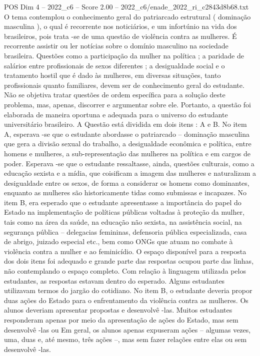 \begin{textsample}{POS Dim 4 – 2022\_c6 – Score 2.00 – 2022\_c6/enade\_2022\_ri\_c2843d8b68.txt}
O tema contemplou o conhecimento geral do patriarcado estrutural ( dominação masculina ), o qual é recorrente nos noticiários, e um infortúnio na vida dos brasileiros, pois trata -se de uma questão de violência contra as mulheres.
É recorrente assistir ou ler notícias sobre o domínio masculino na sociedade brasileira.
Questões como a participação da mulher na política ; a paridade de salários entre profissionais de sexos diferentes ; a desigualdade social e o tratamento hostil que é dado às mulheres, em diversas situações, tanto profissionais quanto familiares, devem ser de conhecimento geral do estudante.
Não se objetiva tratar questões de ordem específica para a solução deste problema, mas, apenas, discorrer e argumentar sobre ele.
Portanto, a questão foi elaborada de maneira oportuna e adequada para o universo do estudante universitário brasileiro.
A Questão está dividida em dois itens : A e B.
No item A, esperava -se que o estudante abordasse o patriarcado – dominação masculina que gera a divisão sexual do trabalho, a desigualdade econômica e política, entre homens e mulheres, a sub-representação das mulheres na política e em cargos de poder.
Esperava -se que o estudante ressaltasse, ainda, questões culturais, como a educação sexista e a mídia, que coisificam a imagem das mulheres e naturalizam a desigualdade entre os sexos, de forma a considerar os homens como dominantes, enquanto as mulheres são historicamente tidas como submissas e incapazes.
No item B, era esperado que o estudante apresentasse a importância do papel do Estado na implementação de políticas públicas voltadas à proteção da mulher, tais como na área da saúde, na educação não sexista, na assistência social, na segurança pública – delegacias femininas, defensoria pública especializada, casa de abrigo, juizado especial etc., bem como ONGs que atuam no combate à violência contra a mulher e ao feminicídio.
O espaço disponível para a resposta dos dois itens foi adequado e grande parte das respostas ocupou parte das linhas, não contemplando o espaço completo.
Com relação à linguagem utilizada pelos estudantes, as respostas estavam dentro do esperado.
Alguns estudantes utilizavam termos do jargão do cotidiano.
No item B, o estudante deveria propor duas ações do Estado para o enfrentamento da violência contra as mulheres.
Os alunos deveriam apresentar propostas e desenvolvê -las.
Muitos estudantes responderam apenas por meio da apresentação de ações do Estado, mas sem desenvolvê -las ou Em geral, os alunos apenas expuseram ações – algumas vezes, uma, duas e, até mesmo, três ações –, mas sem fazer relações entre elas ou sem desenvolvê -las.

\end{textsample}
